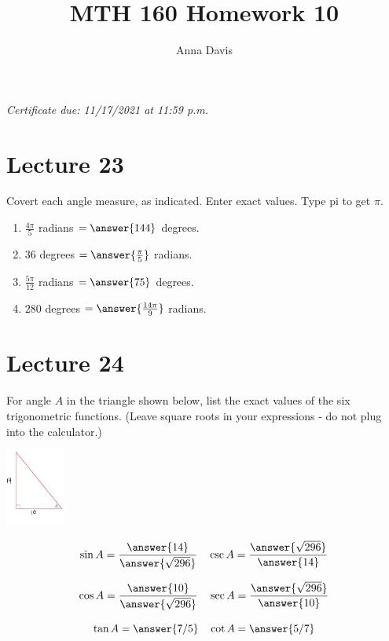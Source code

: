 \documentclass{ximera}
\author{Anna Davis} \title{MTH 160 Homework 10}
\begin{document}
\begin{abstract}

\end{abstract}
\maketitle
 \textit{Certificate due: 11/17/2021 at 11:59 p.m.}
 \section{Lecture 23}
\begin{problem}\label{prob:160hom10prob1}
Covert each angle measure, as indicated.  Enter exact values.  Type pi to get $\pi$.
\begin{enumerate}
    \item $\frac{4\pi}{5}$ radians $=\answer{144}$ degrees.
    \item $36$ degrees $=\answer{\frac{\pi}{5}}$ radians.
    \item $\frac{5\pi}{12}$ radians $=\answer{75}$ degrees.
    \item $280$ degrees $=\answer{\frac{14\pi}{9}}$ radians.
\end{enumerate}
\end{problem}

\section{Lecture 24}

\begin{problem}\label{prob:160hom10prob2}
For angle $A$ in the triangle shown below, list the exact values of the six trigonometric functions. (Leave square roots in your expressions - do not plug into the calculator.)
\begin{image}
   
\includegraphics[height=1in]{160H10pic5.jpg}~
 
\end{image}

$$\sin A=\frac{\answer{14}}{\answer{\sqrt{296}}}\quad \csc A=\frac{\answer{\sqrt{296}}}{\answer{14}}$$

$$\cos A=\frac{\answer{10}}{\answer{\sqrt{296}}}\quad \sec A=\frac{\answer{\sqrt{296}}}{\answer{10}}$$

$$\tan A=\answer{7/5}\quad \cot A=\answer{5/7}$$
\end{problem}
\end{document}

